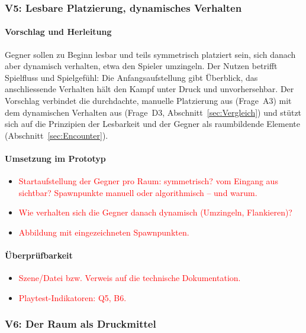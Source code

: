 \documentclass[../Main.tex]{subfiles}
\begin{document}
\subsubsection{V5: Lesbare Platzierung, dynamisches Verhalten} \label{sec:V5}

\paragraph{Vorschlag und Herleitung}
Gegner sollen zu Beginn lesbar und teils symmetrisch platziert sein, sich danach aber dynamisch verhalten, etwa den Spieler umzingeln. Der Nutzen betrifft Spielfluss und Spielgefühl: Die Anfangsaufstellung gibt Überblick, das anschliessende Verhalten hält den Kampf unter Druck und unvorhersehbar. Der Vorschlag verbindet die durchdachte, manuelle Platzierung aus  (Frage~A3) mit dem dynamischen Verhalten aus  (Frage~D3, Abschnitt~\ref{sec:Vergleich}) und stützt sich auf die Prinzipien der Lesbarkeit und der Gegner als raumbildende Elemente (Abschnitt~\ref{sec:Encounter}).

\paragraph{Umsetzung im Prototyp}
\begin{itemize}[leftmargin=1.5cm]
    \item \textcolor{red}{Startaufstellung der Gegner pro Raum: symmetrisch? vom Eingang aus sichtbar? Spawnpunkte manuell oder algorithmisch -- und warum.}
    \item \textcolor{red}{Wie verhalten sich die Gegner danach dynamisch (Umzingeln, Flankieren)?}
    \item \textcolor{red}{Abbildung mit eingezeichneten Spawnpunkten.}
\end{itemize}

\paragraph{Überprüfbarkeit}
\begin{itemize}[leftmargin=1.5cm]
    \item \textcolor{red}{Szene/Datei bzw. Verweis auf die technische Dokumentation.}
    \item \textcolor{red}{Playtest-Indikatoren: Q5, B6.}
\end{itemize}

\subsubsection{V6: Der Raum als Druckmittel} \label{sec:V6}
\end{document}
